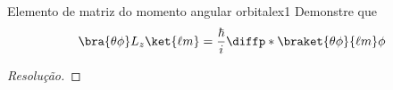 \begin{exercício}{Elemento de matriz do momento angular orbital}{ex1}
    Demonstre que
    \begin{equation*}
        \bra{\theta \phi} L_z \ket{\ell m} = \frac{\hbar}{i} \diffp*{\braket{\theta \phi}{\ell m}}{\phi}
    \end{equation*}
\end{exercício}
\begin{proof}[Resolução]
    
\end{proof}
